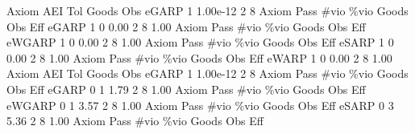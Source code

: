 {\smallskip}
       Axiom {\VBAR}       AEI        Tol      Goods        Obs 
       eGARP {\VBAR}         1   1.00e-12          2          8 
{\smallskip}
{\smallskip}
{\smallskip}
       Axiom {\VBAR} Pass        \#vio        \%vio       Goods         Obs         Eff  
       eGARP {\VBAR}    1           0        0.00           2           8        1.00  
{\smallskip}
{\smallskip}
{\smallskip}
       Axiom {\VBAR} Pass        \#vio        \%vio       Goods         Obs         Eff  
      eWGARP {\VBAR}    1           0        0.00           2           8        1.00  
{\smallskip}
{\smallskip}
{\smallskip}
       Axiom {\VBAR} Pass        \#vio        \%vio       Goods         Obs         Eff  
       eSARP {\VBAR}    1           0        0.00           2           8        1.00  
{\smallskip}
{\smallskip}
{\smallskip}
       Axiom {\VBAR} Pass        \#vio        \%vio       Goods         Obs         Eff  
       eWARP {\VBAR}    1           0        0.00           2           8        1.00  
{\smallskip}
       Axiom {\VBAR}       AEI        Tol      Goods        Obs 
       eGARP {\VBAR}         1   1.00e-12          2          8 
{\smallskip}
{\smallskip}
{\smallskip}
       Axiom {\VBAR} Pass        \#vio        \%vio       Goods         Obs         Eff  
       eGARP {\VBAR}    0           1        1.79           2           8        1.00  
{\smallskip}
{\smallskip}
{\smallskip}
       Axiom {\VBAR} Pass        \#vio        \%vio       Goods         Obs         Eff  
      eWGARP {\VBAR}    0           1        3.57           2           8        1.00  
{\smallskip}
{\smallskip}
{\smallskip}
       Axiom {\VBAR} Pass        \#vio        \%vio       Goods         Obs         Eff  
       eSARP {\VBAR}    0           3        5.36           2           8        1.00  
{\smallskip}
{\smallskip}
{\smallskip}
       Axiom {\VBAR} Pass        \#vio        \%vio       Goods         Obs         Eff  
